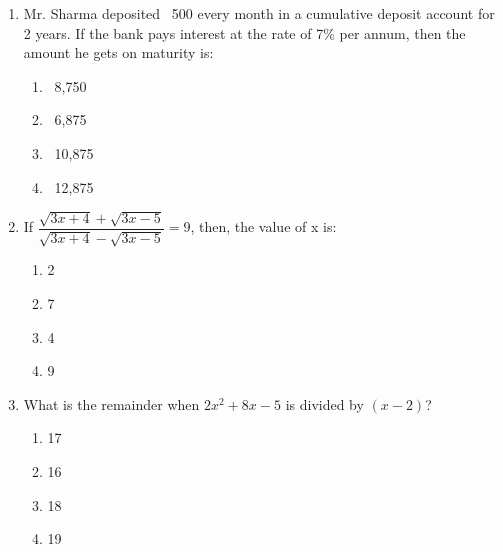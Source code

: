 \begin{enumerate}[label=(\roman*)]

    \item Mr. Sharma deposited \rupee~500 every month in a cumulative deposit
        account for 2 years. If the bank pays interest at the rate of 7\% per
        annum, then the amount he gets on maturity is:

        \begin{multicols}{2}
        \begin{enumerate}[label=(\alph*)]
            \item \rupee~8,750 
            \item \rupee~6,875
            \item \rupee~10,875 
            \item \rupee~12,875 
        \end{enumerate}
        \end{multicols}

    \newpage
    \item If $\dfrac{\sqrt{3x+4} + \sqrt{3x-5}}{\sqrt{3x+4} - \sqrt{3x-5}} = 9$, 
        then, the value of x is:

        \begin{multicols}{2}
        \begin{enumerate}[label=(\alph*)]
            \item 2
            \item 7
            \item 4
            \item 9
        \end{enumerate}
        \end{multicols}

    \item What is the remainder when $2x^2 + 8x -5$ is divided by $(x-2)$?

        \begin{multicols}{2}
        \begin{enumerate}[label=(\alph*)]
            \item 17 
            \item 16 
            \item 18 
            \item 19 
        \end{enumerate}
        \end{multicols}


\end{enumerate}
